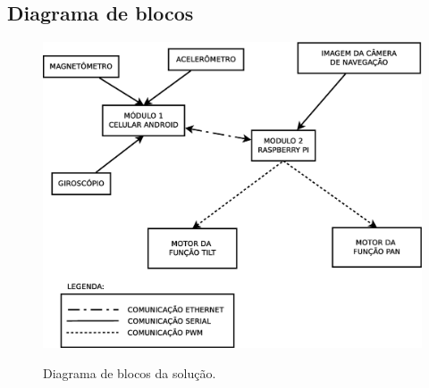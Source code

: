 \documentclass[12pt,a4paper]{article}
\begin{document}
\subsection{Diagrama de blocos}
\begin{figure}[H]
	\centering
	\includegraphics[scale=0.45]{diagrama-modulos} 
	\label{fig:diag-modulos}
	\caption{Diagrama de blocos da solução.}
\end{figure}
\end{document}
